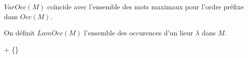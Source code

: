 \documentclass[math, info]{cours}
\begin{document}
\begin{proposition}
	$VarOcc(M)$ coïncide avec l'ensemble des mots maximaux pour l'ordre préfixe dans $Occ(M)$.
	\label{prop:varoccegalmaxocc}
\end{proposition}

\begin{definition}
	On définit $LamOcc(M)$ l'ensemble des occurences d'un lieur $\lambda$ dans $M$.
	\begin{center}
		\begin{mgrammar}
			 + \{\epsilon\}{}
		\end{mgrammar}
	\end{center}
	\label{def:lamocc}
\end{definition}
\end{document}
